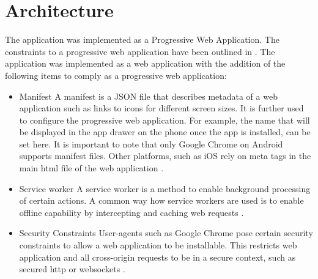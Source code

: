 \section{Architecture\label{architecture}}
The application was implemented as a Progressive Web Application. The constraints to a progressive web application have been outlined in \cite{undefined}. The application was implemented as a web application with the addition of the following items to comply as a progressive web application:
\begin{itemize}
\item Manifest
A manifest is a JSON file that describes metadata of a web application such as links to icons for different screen sizes. It is further used to configure the progressive web application. For example, the name that will be displayed in the app drawer on the phone once the app is installed, can be set here. It is important to note that only Google Chrome on Android supports manifest files. \cite{manifest} Other platforms, such as iOS rely on meta tags in the main html file of the web application \cite{applemetatags}. 
\item Service worker
A service worker is a method to enable background processing of certain actions. A common way how service workers are used is to enable offline capability by intercepting and caching web requests \cite{serviceworkers}.
\item Security Constraints
User-agents such as Google Chrome pose certain security constraints to allow a web application to be installable. This restricts web application and all cross-origin requests to be in a secure context, such as secured http or websockets \cite{manifest}.
\end{itemize}

